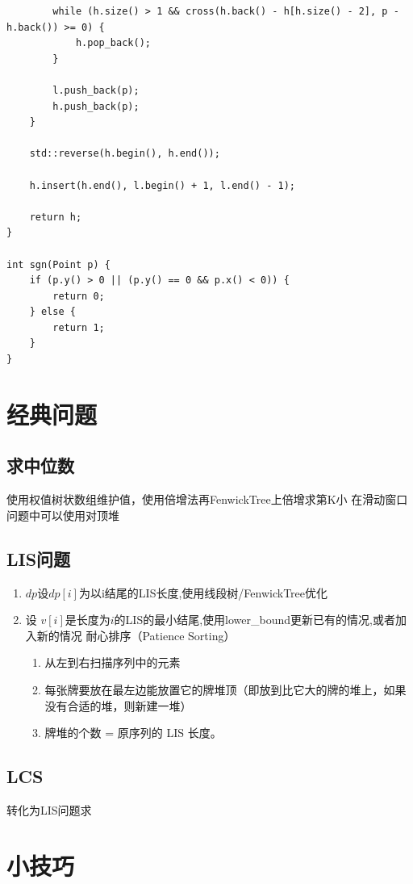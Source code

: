 \documentclass[UTF8,twoside]{ctexart}
\begin{document}
\begin{lstlisting}
        while (h.size() > 1 && cross(h.back() - h[h.size() - 2], p - h.back()) >= 0) {
            h.pop_back();
        }

        l.push_back(p);
        h.push_back(p);
    }

    std::reverse(h.begin(), h.end());

    h.insert(h.end(), l.begin() + 1, l.end() - 1);

    return h;
}

int sgn(Point p) {
    if (p.y() > 0 || (p.y() == 0 && p.x() < 0)) {
        return 0;
    } else {
        return 1;
    }
}
\end{lstlisting}
\section{经典问题}
\subsection{求中位数}
使用权值树状数组维护值，使用倍增法再FenwickTree上倍增求第K小
在滑动窗口问题中可以使用对顶堆
\subsection{LIS问题}
\begin{enumerate}
    \item $dp$设$dp[i]$为以i结尾的LIS长度,使用线段树/FenwickTree优化
    \item 设 $v[i]$是长度为$i$的LIS的最小结尾,使用lower\_bound更新已有的情况,或者加入新的情况
    耐心排序（Patience Sorting）
    \begin{enumerate}
        \item 从左到右扫描序列中的元素
        \item 每张牌要放在最左边能放置它的牌堆顶（即放到比它大的牌的堆上，如果没有合适的堆，则新建一堆）
        \item 牌堆的个数 = 原序列的 LIS 长度。
    \end{enumerate}
\end{enumerate}
\subsection{LCS}
转化为LIS问题求
\section{小技巧}
\end{document}
